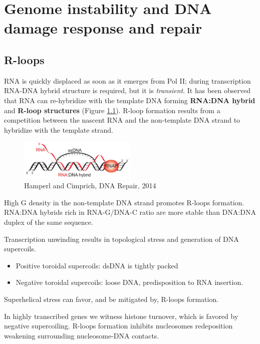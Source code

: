 \graphicspath{{chapters/_resources/}}

\chapter{Genome instability and DNA damage response and repair}


\hypertarget{r-loops}{%
\section{R-loops}\label{r-loops}}

RNA is quickly displaced as soon as it emerges from Pol II; during transcription RNA-DNA hybrid structure is required, but it is \emph{transient}. It has been observed that RNA can re-hybridize with the template DNA forming \textbf{RNA:DNA hybrid} and \textbf{R-loop structures} (Figure \ref{fig:hybrid}). R-loop formation results from a competition between the nascent RNA and the non-template DNA strand to hybridize with the template strand.

\begin{figure}
\centering
\includegraphics[width=0.5\textwidth]{../_resources/Screen_Shot_2022-11-23_at_09-53-33.png}
\caption{Hamperl and Cimprich, DNA Repair, 2014}
\label{fig:hybrid}
\end{figure}

High G density in the non-template DNA strand promotes R-loops formation. RNA:DNA hybrids rich in RNA-G/DNA-C ratio are more stable than DNA:DNA duplex of the same sequence.

Transcription unwinding results in topological stress and generation of DNA supercoils.
\begin{itemize}
\tightlist
\item
  Positive toroidal supercoils: dsDNA is tightly packed
\item
  Negative toroidal supercoils: loose DNA, predisposition to RNA insertion.
\end{itemize}

Superhelical stress can favor, and be mitigated by, R-loops formation.

In highly transcribed genes we witness histone turnover, which is favored by negative supercoiling. R-loops formation inhibits nucleosomes redeposition weakening surrounding nucleosome-DNA contacts.

